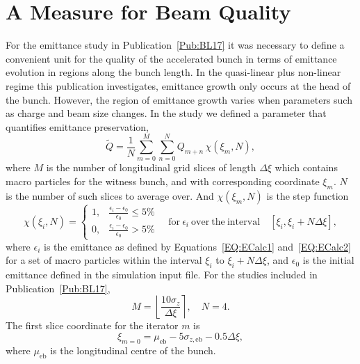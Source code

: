 \section{A Measure for Beam Quality}
\label{SimA:QTilde}

For the emittance study in Publication~\ref{Pub:BL17} it was necessary to define a convenient unit for the quality of the accelerated bunch in terms of emittance evolution in regions along the bunch length.
In the quasi-linear plus non-linear regime this publication investigates, emittance growth only occurs at the head of the bunch.
However, the region of emittance growth varies when parameters such as charge and beam size changes.
In the study we defined a parameter that quantifies emittance preservation,
\begin{equation}
    \tilde{Q} = \frac{1}{N} \sum_{m=0}^{M} \sum_{n=0}^{N} Q_{m+n}\,\chi(\xi_{m},N),\label{EQ:BeamQ}
\end{equation}
where $M$ is the number of longitudinal grid slices of length $\Delta\xi$ which contains macro particles for the witness bunch, and with corresponding coordinate $\xi_{m}$.
$N$ is the number of such slices to average over.
And $\chi(\xi_{m},N)$ is the step function
\begin{equation}
    \chi(\xi_{i},N) =
    \begin{cases}
        1, & \frac{\epsilon_{i} - \epsilon_{0}}{\epsilon_{0}} \leq 5\% \\
        0, & \frac{\epsilon_{i} - \epsilon_{0}}{\epsilon_{0}} > 5\%
    \end{cases}
    \quad\mathrm{for~}\epsilon_{i}\mathrm{~over~the~interval}\quad
    [\xi_{i}, \xi_{i} + N\Delta\xi],
\end{equation}
where $\epsilon_{i}$ is the emittance as defined by Equations~\ref{EQ:ECalc1} and~\ref{EQ:ECalc2} for a set of macro particles within the interval $\xi_{i}$ to $\xi_{i} + N\Delta\xi$, and $\epsilon_{0}$ is the initial emittance defined in the simulation input file.
For the studies included in Publication~\ref{Pub:BL17},
\begin{equation}
    M = \left\lfloor \frac{10\sigma_{z}}{\Delta\xi} \right\rceil, \quad
    N = 4.
\end{equation}
The first slice coordinate for the iterator $m$ is
\begin{equation}
    \xi_{m=0} = \mu_{\mathrm{eb}} - 5\sigma_{z,\mathrm{eb}} - 0.5\Delta\xi,
\end{equation}
where $\mu_{\mathrm{eb}}$ is the longitudinal centre of the bunch.

